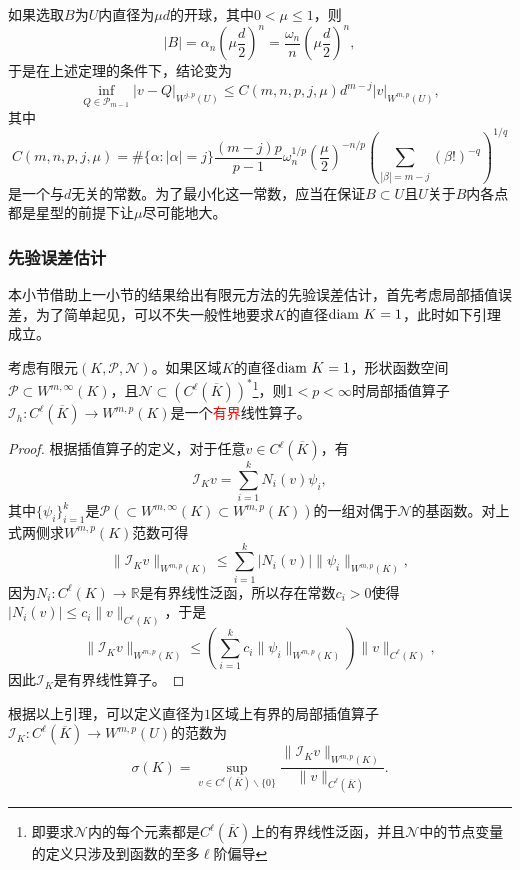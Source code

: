 \documentclass[a4paper,10pt]{ctexart}
\begin{document}
如果选取$ B $为$ U $内直径为$ \mu d $的开球，其中$ 0<\mu\leqslant 1 $，则
\[
    |B| = \alpha_n (\mu \frac{d}{2})^n = \frac{\omega_n}{n} (\mu \frac{d}{2})^n,
\]
于是在上述定理的条件下，结论变为
\[
    \inf_{Q\in \mathcal{P}_{m-1}} |v-Q|_{W^{j,p}(U)} \leqslant C(m,n,p,j,\mu)d^{m-j} |v|_{W^{m,p}(U)},
\]
其中
\[
    C(m,n,p,j,\mu) = \#\{\alpha:|\alpha|=j\} \frac{(m-j)p}{p-1} \omega_n^{1 / p}(\frac{\mu}{2})^{-n / p}\left( \sum_{|\beta|=m-j} (\beta!)^{-q} \right) ^{1 / q}
\]
是一个与$ d $无关的常数。为了最小化这一常数，应当在保证$ B\subset U $且$ U $关于$ B $内各点都是星型的前提下让$ \mu $尽可能地大。

\subsubsection{先验误差估计}
本小节借助上一小节的结果给出有限元方法的先验误差估计，首先考虑局部插值误差，为了简单起见，可以不失一般性地要求$ K $的直径$ {\rm diam}\ K=1 $，此时如下引理成立。
\begin{lemma}
    考虑有限元$ (K,\mathcal{P},\mathcal{N}) $。如果区域$ K $的直径$ {\rm diam}\ K=1 $，形状函数空间$ \mathcal{P}\subset W^{m,\infty}(K) $，且$ \mathcal{N}\subset (C^\ell(\overline{K}))^* $\footnote{即要求$ \mathcal{N} $内的每个元素都是$ C^\ell(\overline{K}) $上的有界线性泛函，并且$ \mathcal{N} $中的节点变量的定义只涉及到函数的至多$ \ell $阶偏导}，则$ 1<p<\infty $时局部插值算子$ \mathcal{I}_h:C^\ell(\overline{K})\to W^{m,p}(K) $是一个\textcolor{red}{有界}线性算子。
\end{lemma}
\begin{proof}
    根据插值算子的定义，对于任意$ v\in C^\ell(\overline{K}) $，有
    \[
        \mathcal{I}_K v = \sum_{i=1}^k N_i(v) \psi_i,
    \]
    其中$ \{\psi_i\}_{i=1}^k $是$ \mathcal{P}(\subset W^{m,\infty}(K)\subset W^{m,p}(K)) $的一组对偶于$ \mathcal{N} $的基函数。对上式两侧求$ W^{m,p}(K) $范数可得
    \[
        \| \mathcal{I}_K v \|_{W^{m,p}(K)} \leqslant \sum_{i=1}^k |N_i(v)| \| \psi_i \|_{W^{m,p}(K)},
    \]
    因为$ N_i:C^\ell(K)\to \mathbb{R} $是有界线性泛函，所以存在常数$ c_i>0 $使得$ |N_i(v)|\leqslant c_i \| v \|_{C^\ell(K)} $，于是
    \[
        \| \mathcal{I}_K v \|_{W^{m,p}(K)} \leqslant \left( \sum_{i=1}^k c_i \| \psi_i \|_{W^{m,p}(K)} \right) \| v \|_{C^\ell(K)},
    \]
    因此$ \mathcal{I}_K $是有界线性算子。
\end{proof}
根据以上引理，可以定义直径为$ 1 $区域上有界的局部插值算子$ \mathcal{I}_K:C^\ell(\overline{K})\to W^{m,p}(U) $的范数为
\begin{equation}
    \sigma(K) = \sup_{{v\in C^\ell(\overline{K})}\backslash \{0\}} \frac{\| \mathcal{I}_K v \|_{W^{m,p}(K)}}{\| v \|_{C^\ell(\overline{K})}}.
\end{equation}
\end{document}
